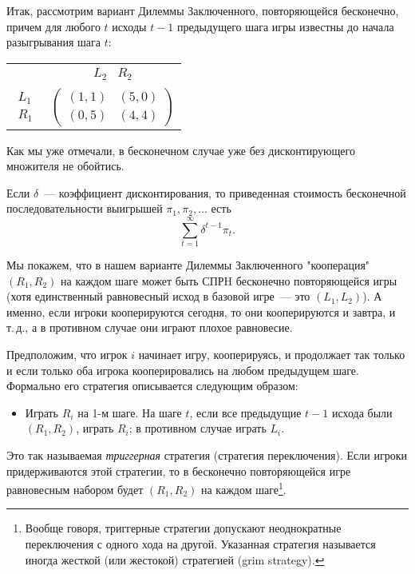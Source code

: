 Итак, рассмотрим вариант Дилеммы Заключенного, повторяющейся
бесконечно, причем для любого $t$ исходы $t-1$ предыдущего шага игры
известны до начала разыгрывания шага $t$:

\begin{center}
\begin{tabular}{cc}
&$\begin{array}{cc} L_2&R_2\end{array}$\\
$\begin{array}{c} L_1\\ R_1\end{array}$&$(\begin{array}{cc}
(1,1)& (5,0)\\
(0,5)&(4,4)\end{array})$\\
\end{tabular}
\end{center}

Как мы уже отмечали, в бесконечном случае уже без дисконтирующего
множителя не обойтись.

\begin{definition}
Если $\delta$~--- коэффициент дисконтирования, то приведенная стоимость
бесконечной последовательности выигрышей $\pi_1,\pi_2,\ldots$ есть
$$
\sum^\infty_{t=1}\delta^{t-1}\pi_t.
$$
\end{definition}

Мы покажем, что в нашем варианте Дилеммы Заключенного
"кооперация" $(R_1,R_2)$ на каждом шаге  может быть  СПРH
бесконечно повторяющейся игры (хотя единственный равновесный исход в
базовой игре~--- это $(L_1,L_2)$). А именно, если игроки кооперируются
сегодня, то они кооперируются и завтра, и т.\,д., а в противном случае
они играют плохое равновесие.

Предположим, что игрок $i$ начинает игру, кооперируясь, и продолжает
так только и если только оба игрока кооперировались на любом
предыдущем шаге.  Формально его стратегия описывается следующим
образом:
\begin{itemize}
\item[]
Играть $R_i$ на 1-м шаге. На шаге $t$, если все предыдущие $t-1$
исхода были $(R_1,R_2)$, играть $R_i$; в противном случае играть
$L_i$. \end{itemize}

Это так называемая {\it триггерная} стратегия (стратегия
переключения). Если игроки придерживаются этой стратегии, то в
бесконечно повторяющейся игре равновесным набором будет $(R_1,R_2)$
на каждом шаге\footnote{ Вообще говоря, триггерные стратегии
допускают неоднократные переключения с одного хода на другой.
Указанная стратегия называется иногда жесткой (или жестокой)
стратегией (grim strategy).}.

